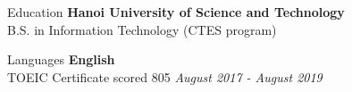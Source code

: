\documentclass{resume}
\begin{document}
  \begin{rSection}{Education}
    {\bf Hanoi University of Science and Technology} \\ 
    { B.S. in Information Technology (CTES program) } \\
  \end{rSection}

  \begin{rSection}{Languages}
    {\bf English} \\ 
    { TOEIC Certificate scored 805  } \hfill {\em August 2017 - August 2019} \\
  \end{rSection}
\end{document}
